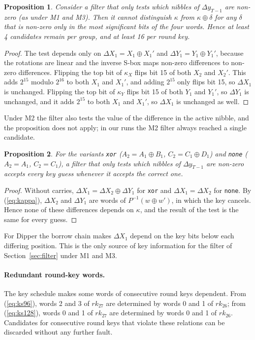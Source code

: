 \documentclass[pdflatex,sn-mathphys-num]{sn-jnl}
\theoremstyle{thmstyleone}%
\newtheorem{proposition}{Proposition}%
\theoremstyle{thmstylethree}%
\newcommand{\rk}{\mathit{rk}}
\begin{document}
\begin{proposition}\label{prop:msb}
Consider a filter that only tests which nibbles of $\Delta y_{T-1}$ are non-zero (as under M1 and M3).
Then it cannot distinguish $\kappa$ from $\kappa\oplus\delta$ for any $\delta$ that is non-zero only in
the most significant bits of the four words. Hence at least 4 candidates remain per group, and at
least 16 per round key.
\end{proposition}
\begin{proof}
The test depends only on $\Delta X_1 = X_1\oplus X_1'$ and $\Delta Y_1 = Y_1\oplus Y_1'$, because the
rotations are linear and the inverse S-box maps non-zero differences to non-zero differences.
Flipping the top bit of $\kappa_X$ flips bit 15 of both $X_2$ and $X_2'$. This adds $2^{15}$ modulo
$2^{16}$ to both $X_1$ and $X_1'$, and adding $2^{15}$ only flips bit 15, so $\Delta X_1$ is unchanged.
Flipping the top bit of $\kappa_Y$ flips bit 15 of both $Y_1$ and $Y_1'$, so $\Delta Y_1$ is unchanged,
and it adds $2^{15}$ to both $X_1$ and $X_1'$, so $\Delta X_1$ is unchanged as well.
\end{proof}

Under M2 the filter also tests the value of the difference in the active nibble, and the proposition
does not apply; in our runs the M2 filter always reached a single candidate.

\begin{proposition}\label{prop:zero}
For the variants \texttt{xor} ($A_2 = A_1\oplus B_1$, $C_2 = C_1\oplus D_1$) and \texttt{none}
($A_2 = A_1$, $C_2 = C_1$), a filter that only tests which nibbles of $\Delta y_{T-1}$ are non-zero
accepts every key guess whenever it accepts the correct one.
\end{proposition}
\begin{proof}
Without carries, $\Delta X_1 = \Delta X_2\oplus\Delta Y_1$ for \texttt{xor} and $\Delta X_1 = \Delta X_2$
for \texttt{none}. By (\ref{eq:kappa}), $\Delta X_2$ and $\Delta Y_1$ are words of
$P^{-1}(w\oplus w')$, in which the key cancels. Hence none of these differences depends on $\kappa$,
and the result of the test is the same for every guess.
\end{proof}

For Dipper the borrow chain makes $\Delta X_1$ depend on the key bits below each differing position.
This is the only source of key information for the filter of Section~\ref{sec:filter} under M1 and M3.

\paragraph{Redundant round-key words.} The key schedule makes some words of consecutive round keys
dependent. From (\ref{eq:ks96}), words 2 and 3 of $\rk_{27}$ are determined by words 0 and 1 of
$\rk_{26}$; from (\ref{eq:ks128}), words 0 and 1 of $\rk_{27}$ are determined by words 0 and 1 of
$\rk_{26}$. Candidates for consecutive round keys that violate these relations can be discarded
without any further fault.
\end{document}
